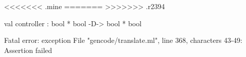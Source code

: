 <<<<<<< .mine
\chklistingfalse
=======
\chklistingtrue
>>>>>>> .r2394
\begin{ChkListingMsg}
val controller : bool * bool -D-> bool * bool 
\end{ChkListingMsg}
\begin{ChkListingErr}
Fatal error: exception File "gencode/translate.ml", line 368, characters 43-49: Assertion failed
\end{ChkListingErr}

